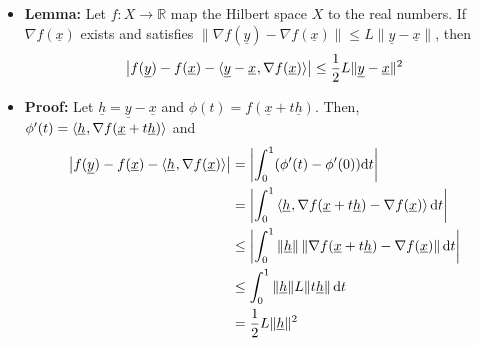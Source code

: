 \documentclass[11pt,twoside]{report}
\newcommand{\bbR}{{\mathbb{R}}}
\newcommand{\vecnot}{\underline}
\newcommand{\tinner}[2]{{\langle #1 \mskip1mu , #2 \rangle}}
\begin{document}
\begin{itemize}
\item \textbf{Lemma:} Let $f \colon X \rightarrow \bbR$ map the Hilbert space $X$ to the real numbers.
If $\nabla f(\vecnot{x})$ exists and satisfies $ \| \nabla f(\vecnot{y}) - \nabla f(\vecnot{x}) \| \leq L \| \vecnot{y} - \vecnot{x} \|$, then
\[
 \big| f(\vecnot{y}) - f(\vecnot{x}) - \tinner{\vecnot{y}-\vecnot{x} }{ \nabla f (\vecnot{x}) } \big| \leq \frac{1}{2} L \| \vecnot{y}-\vecnot{x} \|^2
\]


\item \textbf{Proof:} 
Let $\vecnot{h} = \vecnot{y}-\vecnot{x}$ and $\phi(t) = f(\vecnot{x} + t \vecnot{h})$. Then, $\phi'(t) = \tinner{ \vecnot{h} }{ \nabla f(\vecnot{x} + t \vecnot{h}) }$ and 
\begin{align*}
\big| f(\vecnot{y}) -  f(\vecnot{x}) - \tinner{ \vecnot{h} }{ \nabla f(\vecnot{x}) } \big|  &= \left| \int_{0}^1 \left( \phi'(t) - \phi'(0) \right) \dd t \right| \\
&=  \left| \int_{0}^1 \tinner{ \vecnot{h} }{ \nabla f(\vecnot{x} + t \vecnot{h}) - \nabla f(\vecnot{x}) } \, \mathrm{d}t \right| \\
&\leq \left| \int_{0}^1  \| \vecnot{h} \| \, \| \nabla f(\vecnot{x} + t \vecnot{h}) - \nabla f(\vecnot{x}) \| \, \mathrm{d}t \right| \\
&\leq \int_{0}^1 \|\vecnot{h} \| L \| t \vecnot{h} \| \, \mathrm{d}t \\
& = \frac{1}{2} L \| \vecnot{h} \|^2
\end{align*}
\end{itemize}

 
\end{document}
